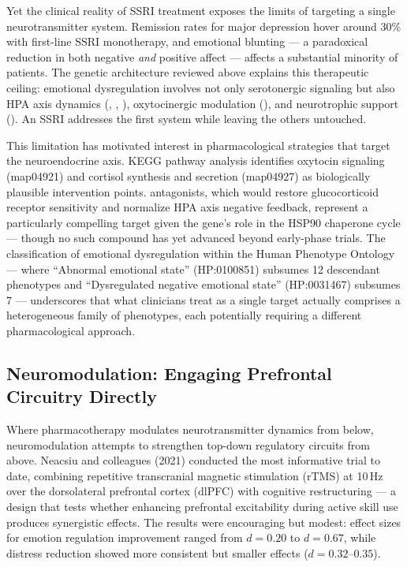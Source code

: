 Yet the clinical reality of SSRI treatment exposes the limits of targeting a
single neurotransmitter system.
Remission rates for major depression hover around 30\% with first-line SSRI
monotherapy, and emotional blunting — a paradoxical reduction in both negative
\emph{and} positive affect — affects a substantial minority of
patients.
The genetic architecture reviewed above explains this therapeutic ceiling:
emotional dysregulation involves not only serotonergic signaling but also
HPA axis dynamics (, , ), oxytocinergic
modulation (), and neurotrophic support ().
An SSRI addresses the first system while leaving the others untouched.

This limitation has motivated interest in pharmacological strategies that
target the neuroendocrine axis.
KEGG pathway analysis identifies oxytocin signaling (map04921) and cortisol
synthesis and secretion (map04927) as biologically plausible intervention
points.
 antagonists, which would restore glucocorticoid receptor
sensitivity and normalize HPA axis negative feedback, represent a particularly
compelling target given the gene's role in the HSP90 chaperone cycle —
though no such compound has yet advanced beyond early-phase trials.
The classification of emotional dysregulation within the Human Phenotype
Ontology — where ``Abnormal emotional state'' (HP:0100851) subsumes 12
descendant phenotypes and ``Dysregulated negative emotional state''
(HP:0031467) subsumes 7 — underscores that what clinicians treat as a single
target actually comprises a heterogeneous family of phenotypes, each
potentially requiring a different pharmacological approach.

\subsection*{Neuromodulation: Engaging Prefrontal Circuitry Directly}

Where pharmacotherapy modulates neurotransmitter dynamics from below,
neuromodulation attempts to strengthen top-down regulatory circuits from above.
Neacsiu and colleagues (2021) conducted the most informative trial to date,
combining repetitive transcranial magnetic stimulation (rTMS) at 10\,Hz over
the dorsolateral prefrontal cortex (dlPFC) with cognitive restructuring — a
design that tests whether enhancing prefrontal excitability during active
skill use produces synergistic effects.
The results were encouraging but modest: effect sizes for emotion regulation
improvement ranged from $d = 0.20$ to $d = 0.67$, while distress reduction
showed more consistent but smaller effects ($d = 0.32$--$0.35$).

